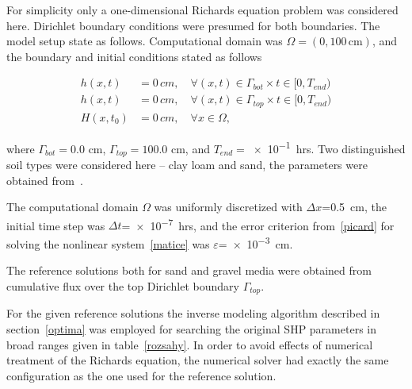 \documentclass[review,times,3p,10pt]{elsarticle}
\newenvironment{lineq}
    {\begin{linenomath*}
    \begin{equation}
    }
    { 
    \end{equation} 
    \end{linenomath*}
    }
\begin{document}
 For simplicity only a one-dimensional Richards equation problem was considered here.  Dirichlet boundary conditions were presumed for both boundaries. The model setup state as follows. Computational domain was $\Omega=(0,100\,\mathrm{cm})$, and the boundary and initial conditions stated as follows
 \begin{lineq}
 \begin{split}
 h(x,t) &= 0\, cm, \quad \forall (x,t) \in \Gamma_{bot} \times  t \in [0, T_{end}) \\ 
  h(x,t) &= 0\, cm, \quad \forall (x,t) \in \Gamma_{top} \times  t \in [0, T_{end}) \\ 
  H(x,t_0) &= 0\, cm , \quad \forall x \in \Omega,
  \end{split}
\end{lineq}
 where $\Gamma_{bot}=0.0$ cm, $\Gamma_{top}=100.0$ cm, and $T_{end}=$\num{e-1}~hrs. Two distinguished soil types were considered here -- clay loam and sand, the parameters were obtained from~\citep{retc}.
 

 
  The computational domain $\Omega$ was uniformly discretized with $\Delta x$=0.5~cm, the initial time step was $\Delta t$=\num{e-7}~hrs, and the error criterion from~\eqref{picard} for solving the nonlinear system~\eqref{matice} was   $\varepsilon$=\num{e-3}~cm.
 
 The reference solutions both for sand and gravel media were obtained from  cumulative flux over the top Dirichlet boundary $\Gamma_{top}$.
 
For the given reference solutions the inverse modeling algorithm described in section~\ref{optima} was employed for searching the original SHP parameters in broad ranges given in table~\ref{rozsahy}. 
In order to avoid effects of numerical treatment of the Richards equation, the numerical solver had exactly the same configuration as the one used for the reference solution. 
 
\end{document}
